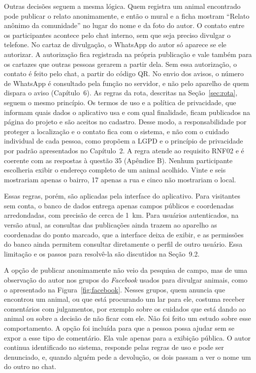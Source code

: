 Outras decisões seguem a mesma lógica. Quem registra um animal encontrado pode publicar o relato anonimamente, e então o mural e a ficha mostram ``Relato anônimo da comunidade'' no lugar do nome e da foto do autor. O contato entre os participantes acontece pelo chat interno, sem que seja preciso divulgar o telefone. No cartaz de divulgação, o WhatsApp do autor só aparece se ele autorizar. A autorização fica registrada na própria publicação e vale também para os cartazes que outras pessoas gerarem a partir dela. Sem essa autorização, o contato é feito pelo chat, a partir do código QR. No envio dos avisos, o número de WhatsApp é consultado pela função no servidor, e não pelo aparelho de quem dispara o aviso (Capítulo~6). As regras da rota, descritas na Seção~\ref{sec:rota}, seguem o mesmo princípio. Os termos de uso e a política de privacidade, que informam quais dados o aplicativo usa e com qual finalidade, ficam publicados na página do projeto e são aceitos no cadastro. Desse modo, a responsabilidade por proteger a localização e o contato fica com o sistema, e não com o cuidado individual de cada pessoa, como propõem a LGPD e o princípio de privacidade por padrão apresentados no Capítulo~2. A regra atende ao requisito RNF02 e é coerente com as respostas à questão 35 (Apêndice B). Nenhum participante escolheria exibir o endereço completo de um animal acolhido. Vinte e seis mostrariam apenas o bairro, 17 apenas a rua e cinco não mostrariam o local.

Essas regras, porém, são aplicadas pela interface do aplicativo. Para visitantes sem conta, o banco de dados entrega apenas campos públicos e coordenadas arredondadas, com precisão de cerca de 1~km. Para usuários autenticados, na versão atual, as consultas das publicações ainda trazem ao aparelho as coordenadas do ponto marcado, que a interface deixa de exibir, e as permissões do banco ainda permitem consultar diretamente o perfil de outro usuário. Essa limitação e os passos para resolvê-la são discutidos na Seção~9.2.

A opção de publicar anonimamente não veio da pesquisa de campo, mas de uma observação do autor nos grupos do \textit{Facebook} usados para divulgar animais, como o apresentado na Figura~\ref{fig:facebook}. Nesses grupos, quem anuncia que encontrou um animal, ou que está procurando um lar para ele, costuma receber comentários com julgamentos, por exemplo sobre os cuidados que está dando ao animal ou sobre a decisão de não ficar com ele. Não foi feito um estudo sobre esse comportamento. A opção foi incluída para que a pessoa possa ajudar sem se expor a esse tipo de comentário. Ela vale apenas para a exibição pública. O autor continua identificado no sistema, responde pelas regras de uso e pode ser denunciado, e, quando alguém pede a devolução, os dois passam a ver o nome um do outro no chat.

